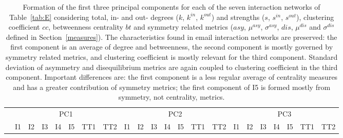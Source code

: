 \documentclass[%
 aip,
 jmp,%
 amsmath,amssymb,
 reprint,%
 floatfix,
]{revtex4-1}
\begin{document}
\begin{table}[!h]
	\caption{Formation of the first three principal components for each of the seven interaction networks of Table~\ref{tab:E} considering total, in- and out- degrees ($k$, $k^{in}$, $k^{out}$) and strengths ($s$, $s^{in}$, $s^{out}$), clustering coefficient $cc$, betweenness centrality $bt$ and symmetry related metrics ($asy$, $\mu^{asy}$, $\sigma^{asy}$, $dis$, $\mu^{dis}$ and $\sigma^{dis}$ defined in Section~\ref*{measures}).
	The characteristics found in email interaction networks are preserved: the first component is an average of degree and betweenness, the second component is mostly governed by symmetry related metrics, and clustering coefficient is mostly relevant for the third component.
Standard deviation of asymmetry and disequilibrium metrics are again coupled to clustering coefficient in the third component.
Important differences are: 
the first component is a less regular average of centrality measures and has a greater contribution of symmetry metrics;
the first component of I5 is formed mostly from symmetry, not centrality, metrics.}
	\footnotesize
	\begin{center}
		\begin{tabular}{| l ||  c |c |c |c |c | c | c || c | c | c | c | c | c | c || c |c |c |c |c | c | c |	}\cline{2-22}
			\multicolumn{1}{c|}{} & \multicolumn{7}{c||}{PC1}          & \multicolumn{7}{c||}{PC2} & \multicolumn{7}{c|}{PC3}  \\\cline{2-22}
			\multicolumn{1}{c|}{} & 
			I1 & I2 & I3 & I4 & I5 & TT1 & TT2 &
			I1 & I2 & I3 & I4 & I5 & TT1 & TT2 &
			I1 & I2 & I3 & I4 & I5 & TT1 & TT2 \\\hline
			
			\hline
		\end{tabular}
	\end{center}
	\label{tab:pcaE3}
\end{table}




\clearpage
\end{document}
